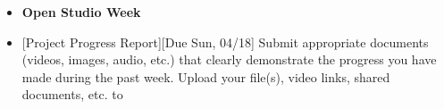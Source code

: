 \def\dMon{Mon, 04/12}
\def\dTues{Tues, 04/13}
\def\dWed{Wed, 04/14}
\def\dThur{Thur, 04/15}
\def\dFri{Fri, 04/16}
\def\dSat{Sat, 04/17}
\def\dSun{Sun, 04/18}
\placeDate

\begin{itemize}[noitemsep,topsep=0pt,leftmargin=*]
    \item \textcolor{defaultColor}{\textbf{Open Studio Week}}
    \item {}[Project Progress Report][Due \dSun] \newline
          Submit appropriate documents (videos, images, audio, etc.) that clearly demonstrate the progress you have made during the past week. Upload your file(s), video links, shared documents, etc. to \discordE
\end{itemize}